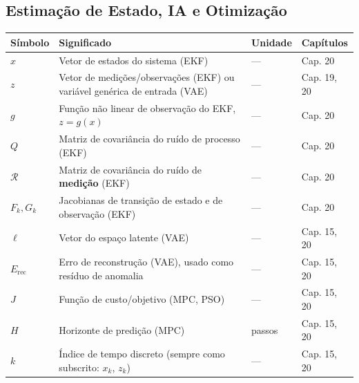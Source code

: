 \documentclass[12pt,a4paper]{article}
\numberwithin{equation}{section}
\numberwithin{table}{section}
\numberwithin{figure}{section}
\begin{document}
{\subsection*{Estimação de Estado, IA e Otimização}
\begin{longtable}{|p{2.0cm}|p{6.1cm}|p{2.1cm}|p{4.2cm}|}
	\hline
	\textbf{Símbolo} & \textbf{Significado} & \textbf{Unidade} & \textbf{Capítulos} \\ \hline
	\endhead
	$x$ & Vetor de estados do sistema (EKF) & --- & Cap. 20 \\ \hline
	$z$ & Vetor de medições/observações (EKF) ou variável genérica de entrada (VAE) & --- & Cap. 19, 20 \\ \hline
	$g$\dag & Função não linear de observação do EKF, $z=g(x)$ & --- & Cap. 20 \\ \hline
	$Q$ & Matriz de covariância do ruído de processo (EKF) & --- & Cap. 20 \\ \hline
	$\mathcal{R}$\dag & Matriz de covariância do ruído de \textbf{medição} (EKF) & --- & Cap. 20 \\ \hline
	$F_k, G_k$ & Jacobianas de transição de estado e de observação (EKF) & --- & Cap. 20 \\ \hline
	$\ell$\dag & Vetor do espaço latente (VAE) & --- & Cap. 15, 20 \\ \hline
	$E_{\text{rec}}$ & Erro de reconstrução (VAE), usado como resíduo de anomalia & --- & Cap. 15, 20 \\ \hline
	$J$ & Função de custo/objetivo (MPC, PSO) & --- & Cap. 15, 20 \\ \hline
	$H$ & Horizonte de predição (MPC) & passos & Cap. 15, 20 \\ \hline
	$k$ & Índice de tempo discreto (sempre como subscrito: $x_k$, $z_k$) & --- & Cap. 15, 20 \\ \hline
\end{longtable}
}
\end{document}
